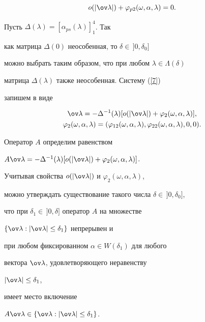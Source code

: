 \begin{pf}
\begin{equation}
o(|\ov \lambda |)+\varphi_{p2} (\omega,\alpha,\lambda)=0.


\end{equation}





Пусть $\Delta (\lambda)=[\alpha_{ps} (\lambda)]_1^4$. Так


как матрица $\Delta (0)$ неособенная, то $\delta \in\,]0,\delta_0]$


можно выбрать таким образом, что при любом $\lambda \in \Lambda (\delta)$


матрица $\Delta (\lambda)$ также неособенная. Систему (\ref{7})


запишем в виде


\begin{gather*}


\ov \lambda = - \Delta ^{- 1} (\lambda)[o(|\ov \lambda |)+


\varphi_2 (\omega,\alpha,\lambda)],\\


\varphi_2 (\omega,\alpha,\lambda)=(\varphi_{12}


(\omega,\alpha,\lambda),\varphi_{22} (\omega,\alpha,\lambda),0,0).


\end{gather*}


Оператор $A$ определим равенством


$A\ov \lambda =- \Delta ^{- 1} (\lambda)[o(|\ov \lambda |)+


\varphi_2 (\omega,\alpha,\lambda)]$.





Учитывая свойства $o(|\ov \lambda |)$ и $\varphi_2 (\omega,\alpha,\lambda)$,


можно утверждать существование такого числа $\delta \in\,]0,\delta_0]$,


что при $\delta_1 \in\,]0,\delta]$ оператор $A$ на множестве


$\{\ov \lambda :|\ov \lambda | \le \delta_1 \}$ непрерывен и


при любом фиксированном $\alpha \in W(\delta_1)$ для любого


вектора ${\ov \lambda}$, удовлетворяющего неравенству


$|\ov \lambda | \le \delta_1$,


имеет место включение


$A\ov \lambda \in \{\ov \lambda :|\ov \lambda | \le \delta_1 \}$.



\end{pf}
